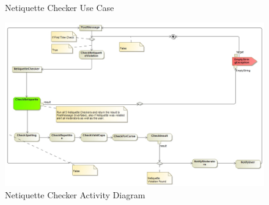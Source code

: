 \documentclass[11pt]{article}
\begin{document}
\begin{enumerate}
\begin{itemize}
\begin{figure}[H]
	  			\caption{Netiquette Checker Use Case}
	  		\end{figure}
	  		\begin{figure}[H]
	  			\includegraphics[scale=0.35]{NetProcessDiagram.jpg}
	  			\caption{Netiquette Checker Activity Diagram}
	  		\end{figure}
	  	\end{itemize}

\end{enumerate}
\newpage
\end{document}
